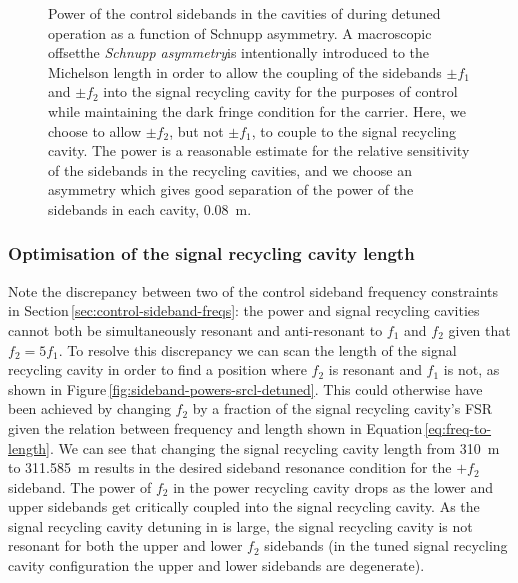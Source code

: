 \begin{figure}
  \centering
  
  \caption[Power of the control sidebands in the cavities of \ETLF{} in detuned configuration as a function of Schnupp asymmetry]{\label{fig:sideband-powers-vs-schnupp-detuned}Power of the control sidebands in the cavities of \ETLF{} during detuned operation as a function of Schnupp asymmetry. A macroscopic offset\textemdash the \emph{Schnupp asymmetry}\textemdash is intentionally introduced to the Michelson length in order to allow the coupling of the sidebands $\pm f_1$ and $\pm f_2$ into the signal recycling cavity for the purposes of control while maintaining the dark fringe condition for the carrier. Here, we choose to allow $\pm f_2$, but not $\pm f_1$, to couple to the signal recycling cavity. The power is a reasonable estimate for the relative sensitivity of the sidebands in the recycling cavities, and we choose an asymmetry which gives good separation of the power of the sidebands in each cavity, \SI{0.08}{\meter}.}
\end{figure}

\subsubsection{Optimisation of the signal recycling cavity length}
Note the discrepancy between two of the control sideband frequency constraints in Section\,\ref{sec:control-sideband-freqs}: the power and signal recycling cavities cannot both be simultaneously resonant and anti-resonant to $f_1$ and $f_2$ given that $f_2 = 5 f_1$. To resolve this discrepancy we can scan the length of the signal recycling cavity in order to find a position where $f_2$ is resonant and $f_1$ is not, as shown in Figure\,\ref{fig:sideband-powers-srcl-detuned}. This could otherwise have been achieved by changing $f_2$ by a fraction of the signal recycling cavity's \gls{FSR} given the relation between frequency and length shown in Equation\,\ref{eq:freq-to-length}. We can see that changing the signal recycling cavity length from \SI{310}{\meter} to \SI{311.585}{\meter} results in the desired sideband resonance condition for the $+f_2$ sideband. The power of $f_2$ in the power recycling cavity drops as the lower and upper sidebands get critically coupled into the signal recycling cavity. As the signal recycling cavity detuning in \ETLF{} is large, the signal recycling cavity is not resonant for both the upper and lower $f_2$ sidebands (in the tuned signal recycling cavity configuration the upper and lower sidebands are degenerate).

